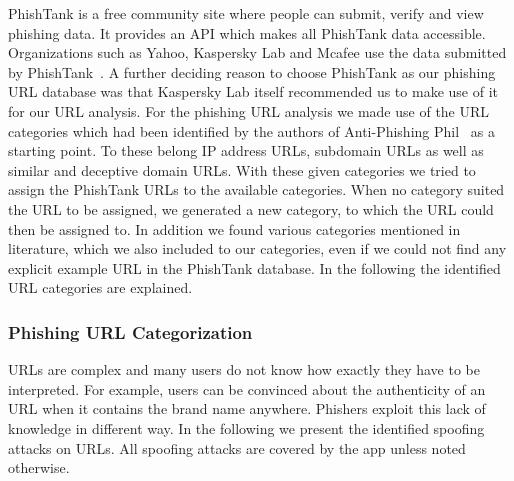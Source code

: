 PhishTank is a free community site where people can submit, verify and view phishing data.
 It provides an API which makes all PhishTank data accessible.
 Organizations such as Yahoo, Kaspersky Lab and Mcafee use the data submitted by PhishTank~\cite{phishtank}. A further deciding reason to choose PhishTank as our phishing URL database was that Kaspersky Lab itself recommended us to make use of it for our URL analysis.
 For the phishing URL analysis we made use of the URL categories which had been identified by the authors of Anti-Phishing Phil~\cite{sheng2007antiphishingphil} as a starting point.
 To these belong IP address URLs, subdomain URLs as well as similar and deceptive domain URLs.
 With these given categories we tried to assign the PhishTank URLs to the available categories.
 When no category suited the URL to be assigned, we generated a new category, to which the URL could then be assigned to.
 In addition we found various categories mentioned in literature, which we also included to our categories, even if we could not find any explicit example URL in the PhishTank database.
 In the following the identified URL categories are explained.


\subsubsection{Phishing URL Categorization}
\label{s:url_categories}
URLs are complex and many users do not know how exactly they have to be interpreted.
 For example, users can be convinced about the authenticity of an URL when it contains the brand name anywhere.
 Phishers exploit this lack of knowledge in different way.
 In the following we present the identified spoofing attacks on URLs. 
 All spoofing attacks are covered by the app unless noted otherwise.

